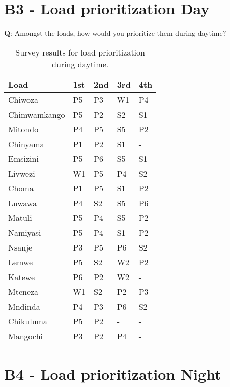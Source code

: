\newpage
\section*{\large{B3 - Load prioritization Day}}
\vspace*{1cm}

\textbf{Q}: Amongst the loads, how would you prioritize them during daytime?\\

\begin{table}[ht!]
\centering
    \begin{tabular}{ m{4cm} m{1.5cm} m{1.5cm} m{1.5cm} m{1.5cm}} 
    \toprule
    \toprule
    \textbf{Load} & \textbf{1st} & \textbf{2nd} & \textbf{3rd} & \textbf{4th}\\
    \midrule
    Chiwoza         & P5 & P3 & W1 & P4 \\
    Chimwamkango    & P5 & P2 & S2 & S1 \\
    Mitondo         & P4 & P5 & S5 & P2 \\
    Chinyama        & P1 & P2 & S1 & - \\
    Emsizini        & P5 & P6 & S5 & S1 \\
    Livwezi         & W1 & P5 & P4 & S2 \\
    Choma           & P1 & P5 & S1 & P2 \\
    Luwawa          & P4 & S2 & S5 & P6 \\
    Matuli          & P5 & P4 & S5 & P2 \\
    Namiyasi        & P5 & P4 & S1 & P2 \\
    Nsanje          & P3 & P5 & P6 & S2 \\
    Lemwe           & P5 & S2 & W2 & P2 \\
    Katewe          & P6 & P2 & W2 & - \\
    Mteneza         & W1 & S2 & P2 & P3 \\
    Mndinda         & P4 & P3 & P6 & S2 \\
    Chikuluma       & P5 & P2 & -  & - \\
    Mangochi        & P3 & P2 & P4 & - \\
    
    \bottomrule
    \bottomrule
    \end{tabular}
\caption[User survey- Load prioritization daytime]{Survey results for load prioritization during daytime.}
\end{table}

\newpage
\section*{\large{B4 - Load prioritization Night}}
\vspace*{1cm}

